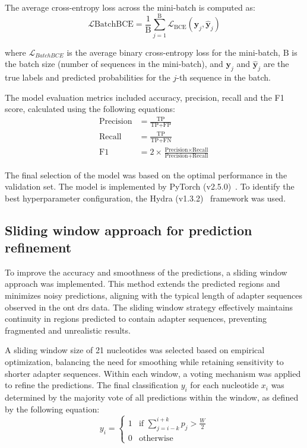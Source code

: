 \documentclass[pdflatex,sn-nature, lineno]{sn-jnl}%
\begin{document}
The average cross-entropy loss across the mini-batch is computed as:
\[
	\mathcal{L}{\textrm{BatchBCE}} = \frac{1}{\textrm{B}} \sum_{j=1}^{\textrm{B}} \mathcal{L}_{\textrm{BCE}}(\mathbf{y}_j, \hat{\mathbf{y}}_j)
\]

where \(\mathcal{L}_{BatchBCE}\) is the average binary cross-entropy loss for the mini-batch, \(\textrm{B}\) is the batch size (number of sequences in the mini-batch),  and \(\mathbf{y}_j\) and \(\hat{\mathbf{y}}_j\) are the true labels and predicted probabilities for the \(j\)-th sequence in the batch.

The model evaluation metrics included accuracy, precision, recall and the F1 score, calculated using the following equations:
\begin{align*}
	\textrm{Precision} & = \frac{\textrm{TP}}{\textrm{TP}+\textrm{FP}}                                                     \\
	\textrm{Recall}    & = \frac{\textrm{TP}}{\textrm{TP}+\textrm{FN}}                                                     \\
	\textrm{F1}        & = 2 \times \frac{\textrm{Precision} \times \textrm{Recall}}{\textrm{Precision} + \textrm{Recall}}
\end{align*}

The final selection of the model was based on the optimal performance in the validation set.
The model is implemented by PyTorch (v2.5.0)~\cite{paszke2019pytorch}.
To identify the best hyperparameter configuration, the Hydra (v1.3.2)~\cite{Yadan2019Hydra} framework was used.

\subsection{Sliding window approach for prediction refinement}

To improve the accuracy and smoothness of the predictions, a sliding window approach was implemented.
This method extends the predicted regions and minimizes noisy predictions, aligning with the typical length of adapter sequences observed in the \gls{ont} \gls{drs} data.
The sliding window strategy effectively maintains continuity in regions predicted to contain adapter sequences, preventing fragmented and unrealistic results.

A sliding window size of 21 nucleotides was selected based on empirical optimization, balancing the need for smoothing while retaining sensitivity to shorter adapter sequences.
Within each window, a voting mechanism was applied to refine the predictions.
The final classification $y_i$ for each nucleotide \( x_i \) was determined by the majority vote of all predictions within the window, as defined by the following equation:
\[
	y_i = \begin{cases}
		1 & \text{if } \sum_{j=i-k}^{i+k} p_j > \frac{W}{2} \\
		0 & \text{otherwise}
	\end{cases}
\]
\end{document}

